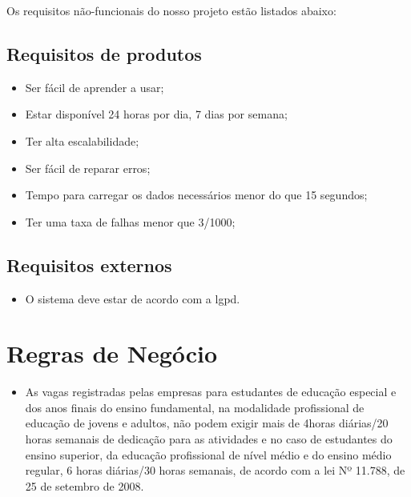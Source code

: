 Os requisitos não-funcionais do nosso projeto estão listados abaixo:

\subsection{Requisitos de produtos}

\begin{itemize}
	\item Ser fácil de aprender a usar;
	\item Estar disponível 24 horas por dia, 7 dias por semana;
	\item Ter alta escalabilidade;
	\item Ser fácil de reparar erros;
	\item Tempo para carregar os dados necessários menor do que 15 segundos;
	\item Ter uma taxa de falhas menor que 3/1000;
\end{itemize}

\subsection{Requisitos externos}

\begin{itemize}
	\item O sistema deve estar de acordo com a \ac{lgpd}.
\end{itemize}

\section{Regras de Negócio}
\begin{itemize}
	\item As vagas registradas pelas empresas para estudantes de educação especial e dos anos finais do ensino fundamental, na modalidade profissional de educação de jovens e adultos, não podem exigir mais de 4horas diárias/20 horas semanais de dedicação para as atividades e no caso de estudantes do ensino superior, da educação profissional de nível médio e do ensino médio regular, 6 horas diárias/30 horas semanais, de acordo com a lei Nº 11.788, de  25 de setembro de 2008.
\end{itemize}

